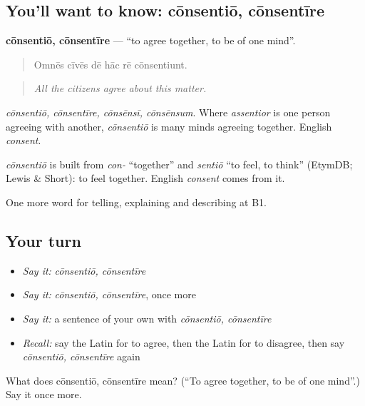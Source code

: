 \subsection*{You'll want to know: cōnsentiō, cōnsentīre}
\textbf{cōnsentiō, cōnsentīre} — \textquotedblleft{}to agree together, to be of one mind\textquotedblright{}.

\begin{quote}
Omnēs cīvēs dē hāc rē cōnsentiunt.
\end{quote}

\begin{quote}
\emph{All the citizens agree about this matter.}
\end{quote}

\emph{cōnsentiō, cōnsentīre, cōnsēnsī, cōnsēnsum}. Where \emph{assentior} is one person agreeing with another, \emph{cōnsentiō} is many minds agreeing together. English \emph{consent}.

\begin{cousinweb}
\emph{cōnsentiō} is built from \emph{con-} \textquotedblleft{}together\textquotedblright{} and \emph{sentiō} \textquotedblleft{}to feel, to think\textquotedblright{} (EtymDB; Lewis \& Short): to feel together. English \emph{consent} comes from it.
\end{cousinweb}

\begin{grammarlens}[title={What you've built}]
One more word for telling, explaining and describing at B1.
\end{grammarlens}

\subsection*{Your turn}
\begin{itemize}
\raggedright
  \item \emph{Say it:} \emph{cōnsentiō, cōnsentīre}
  \item \emph{Say it:} \emph{cōnsentiō, cōnsentīre}, once more
  \item \emph{Say it:} a sentence of your own with \emph{cōnsentiō, cōnsentīre}
  \item \emph{Recall:} say the Latin for to agree, then the Latin for to disagree, then say \emph{cōnsentiō, cōnsentīre} again
\end{itemize}

\begin{tcolorbox}[breakable,colback=teal!4,colframe=teal!35!black,title={Before you move on}]
What does cōnsentiō, cōnsentīre mean? (\textquotedblleft{}To agree together, to be of one mind\textquotedblright{}.) Say it once more.
\end{tcolorbox}
